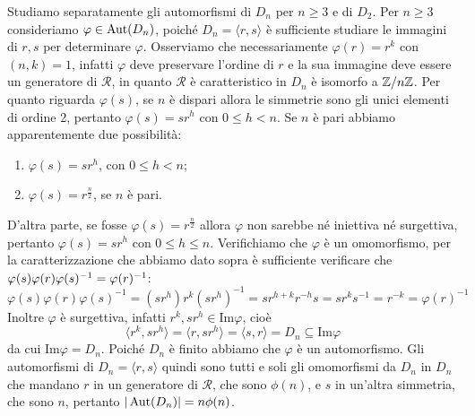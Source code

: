 \documentclass[11pt]{scrartcl}
\begin{document}
Studiamo separatamente gli automorfismi di $D_n$ per $n \geqslant 3$ e di $D_2$.\newline
Per $n\geqslant 3$ consideriamo $\varphi \in \operatorname{Aut}(D_n)$, poiché $D_n = \langle
r, s\rangle$ è sufficiente studiare le immagini di $r, s$ per determinare $\varphi$.
Osserviamo che necessariamente $\varphi(r) = r^k$ con $(n, k) = 1$, infatti 
$\varphi$ deve preservare l'ordine di $r$ e la sua immagine deve essere un 
generatore di $\mathcal{R}$, in quanto $\mathcal{R}$ è caratteristico in $D_n$
è isomorfo a ${\mathbb Z}/n{\mathbb Z}$. Per quanto riguarda $\varphi(s)$, se $n$ è dispari allora le simmetrie
sono gli unici elementi di ordine 2, pertanto $\varphi(s) = sr^h$ con 
$0\leq h < n$. Se $n$ è pari abbiamo apparentemente due possibilità:
\begin{enumerate}[(1)]
    \item $\varphi(s) = sr^h$, con $0\leq h < n$;
    \item $\varphi(s) = r^{\frac n 2}$, se $n$ è pari.
\end{enumerate}

D'altra parte, se fosse $\varphi(s) = r^{\frac n 2}$ allora $\varphi$ non
sarebbe né iniettiva né surgettiva, pertanto $\varphi(s) = sr^h$ con 
$0\leq h \leq n$. Verifichiamo che $\varphi$ è un omomorfismo, per la 
caratterizzazione che abbiamo dato sopra è sufficiente verificare che
$\varphi(s)\varphi(r)\varphi(s)^{-1} = \nolinebreak\varphi(r)^{-1}$:
\[
    \varphi(s)\varphi(r)\varphi(s)^{-1} = (sr^h)r^k(sr^h)^{-1} = sr^{h + k}r^{-h}s =
    sr^k s^{-1} = r^{-k} = \varphi(r)^{-1}
\]
Inoltre $\varphi$ è surgettiva, infatti $r^k, sr^h \in \mathrm{Im}\varphi$,
cioè 
\[
    \langle r^k, sr^h\rangle = \langle r, sr^h\rangle = \langle s, r\rangle =
    D_n\subseteq \mathrm{Im}\varphi
\]da cui $\mathrm{Im}\varphi = D_n$. Poiché $D_n$ è finito abbiamo che $\varphi$
è un automorfismo. Gli automorfismi di $D_n = \langle r, s\rangle$ quindi sono
tutti e soli gli omomorfismi da $D_n$ in $D_n$ che mandano $r$ in un generatore
di $\mathcal{R}$, che sono $\phi(n)$, e $s$ in un'altra simmetria, che sono 
$n$, pertanto $|\operatorname{Aut}(D_n)| = n\phi(n)$.\newline
\end{document}
